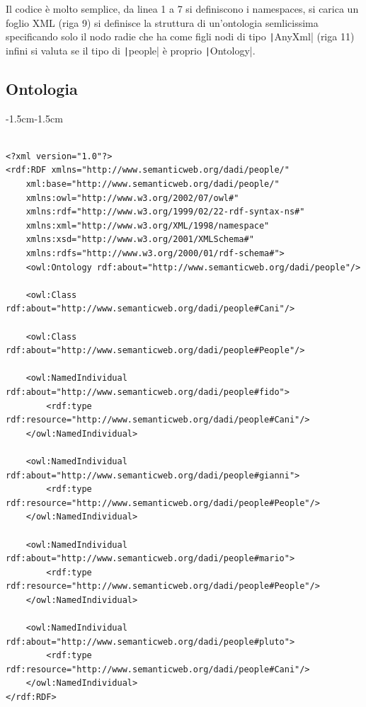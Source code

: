 \documentclass[]{article}
\begin{document}
Il codice è molto semplice, da linea 1 a 7 si definiscono i namespaces, si carica un foglio XML (riga 9) si definisce la struttura di un'ontologia semlicissima specificando solo il nodo radie che ha come figli nodi di tipo \texttt|AnyXml| (riga 11) infini si valuta se il tipo di \texttt|people| è proprio \texttt|Ontology|.

\subsection{Ontologia}

\begin{adjustwidth}{-1.5cm}{-1.5cm}	
	\begin{minipage}{\linewidth} 
	\begin{verbatim}
		
<?xml version="1.0"?>
<rdf:RDF xmlns="http://www.semanticweb.org/dadi/people/"
	xml:base="http://www.semanticweb.org/dadi/people/"
	xmlns:owl="http://www.w3.org/2002/07/owl#"
	xmlns:rdf="http://www.w3.org/1999/02/22-rdf-syntax-ns#"
	xmlns:xml="http://www.w3.org/XML/1998/namespace"
	xmlns:xsd="http://www.w3.org/2001/XMLSchema#"
	xmlns:rdfs="http://www.w3.org/2000/01/rdf-schema#">
	<owl:Ontology rdf:about="http://www.semanticweb.org/dadi/people"/>
	
	<owl:Class rdf:about="http://www.semanticweb.org/dadi/people#Cani"/>
	
	<owl:Class rdf:about="http://www.semanticweb.org/dadi/people#People"/>
	
	<owl:NamedIndividual rdf:about="http://www.semanticweb.org/dadi/people#fido">
		<rdf:type rdf:resource="http://www.semanticweb.org/dadi/people#Cani"/>
	</owl:NamedIndividual>
	
	<owl:NamedIndividual rdf:about="http://www.semanticweb.org/dadi/people#gianni">
		<rdf:type rdf:resource="http://www.semanticweb.org/dadi/people#People"/>
	</owl:NamedIndividual>
	
	<owl:NamedIndividual rdf:about="http://www.semanticweb.org/dadi/people#mario">
		<rdf:type rdf:resource="http://www.semanticweb.org/dadi/people#People"/>
	</owl:NamedIndividual>
	
	<owl:NamedIndividual rdf:about="http://www.semanticweb.org/dadi/people#pluto">
		<rdf:type rdf:resource="http://www.semanticweb.org/dadi/people#Cani"/>
	</owl:NamedIndividual>
</rdf:RDF>

	\end{verbatim}
\end{minipage}
\end{adjustwidth}
\end{document}
